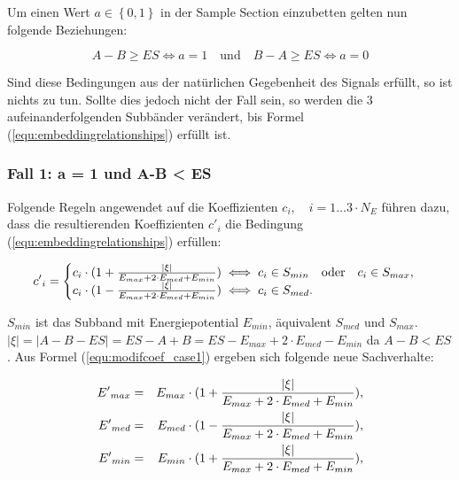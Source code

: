 Um einen Wert $a \in\left\{0,1\right\}$ in der Sample Section einzubetten gelten nun folgende Beziehungen:

	 \begin{equation}
		 A - B \geq ES \iff a = 1 \quad\mbox{und}\quad B - A \geq ES \iff a = 0 \label{equ:embeddingrelationships}
	 \end{equation}
	 
Sind diese Bedingungen aus der natürlichen Gegebenheit des Signals erfüllt, so ist nichts zu tun. Sollte dies jedoch nicht der Fall sein, so werden die 3 aufeinanderfolgenden Subbänder verändert, bis Formel (\ref{equ:embeddingrelationships}) erfüllt ist. 

\subsubsection{Fall 1: a = 1 und A-B < ES} 

Folgende Regeln angewendet auf die Koeffizienten ${c}_{i},\quad i=1\dots{3\cdot{N}_{E}}$ führen dazu, dass die resultierenden Koeffizienten ${c'}_{i}$ die Bedingung (\ref{equ:embeddingrelationships}) erfüllen:

	 \begin{equation}
		 {c'}_{i} = \begin{cases}
    	 				{c}_{i} \cdot ( 1 + { |\xi| \over {{E}_{max} + 2\cdot {E}_{med} + {E}_{min}} }) \iff {c}_{i} \in {S}_{min} \quad\mbox{oder}\quad {c}_{i} \in {S}_{max}, 
						\\
    					{c}_{i} \cdot ( 1 - { |\xi| \over {{E}_{max} + 2\cdot {E}_{med} + {E}_{min}} }) \iff {c}_{i} \in {S}_{med}.
  				  	\end{cases}
		  \label{equ:modifcoef_case1}
	 \end{equation}
	 
${S}_{min}$ ist das Subband mit Energiepotential ${E}_{min}$, äquivalent ${S}_{med}$ und ${S}_{max}$. $|\xi| = |A-B-ES| = ES-A+B = ES - {E}_{max} + 2\cdot {E}_{med} - {E}_{min}$ da $A-B<ES$. Aus Formel (\ref{equ:modifcoef_case1}) ergeben sich folgende neue Sachverhalte:
	 
	 \begin{eqnarray*}
		 {E'}_{max} & = & {E}_{max} \cdot (1 + { |\xi| \over {{E}_{max} + 2\cdot {E}_{med} + {E}_{min}} }),
		 \\ 
		 {E'}_{med} & = & {E}_{med} \cdot (1 - { |\xi| \over {{E}_{max} + 2\cdot {E}_{med} + {E}_{min}} }),
		 \\
		 {E'}_{min} & = & {E}_{min} \cdot (1 + { |\xi| \over {{E}_{max} + 2\cdot {E}_{med} + {E}_{min}} }),
	\end{eqnarray*}	 
	 

